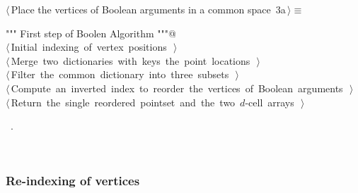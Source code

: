 \documentclass[11pt,oneside]{article}	%
\begin{document}
\begin{flushleft} \small
\begin{minipage}{\linewidth} \label{scrap3}
\protect{}$\langle\,$Place the vertices of Boolean arguments in a common space\nobreak\ {\footnotesize 3a}$\,\rangle\equiv$
\vspace{-1ex}
\begin{list}{}{} \item
\mbox{}\verb@""" First step of Boolen Algorithm """@\\
\mbox{}\verb@@\hbox{$\langle\,$Initial indexing of vertex positions\nobreak\ {\footnotesize {}}$\,\rangle$}\verb@@\\
\mbox{}\verb@@\hbox{$\langle\,$Merge two dictionaries with keys the point locations\nobreak\ {\footnotesize {}}$\,\rangle$}\verb@@\\
\mbox{}\verb@@\hbox{$\langle\,$Filter the common dictionary into three subsets\nobreak\ {\footnotesize {}}$\,\rangle$}\verb@@\\
\mbox{}\verb@@\hbox{$\langle\,$Compute an inverted index to reorder the vertices of Boolean arguments\nobreak\ {\footnotesize {}}$\,\rangle$}\verb@@\\
\mbox{}\verb@@\hbox{$\langle\,$Return the single reordered pointset and the two $d$-cell arrays\nobreak\ {\footnotesize {}}$\,\rangle$}\verb@@\\
\mbox{}\verb@@{\NWsep}
\end{list}
\vspace{-1ex}
\footnotesize\addtolength{\baselineskip}{-1ex}
\begin{list}{}{\setlength{\itemsep}{-\parsep}\setlength{\itemindent}{-\leftmargin}}
\item \NWtxtMacroRefIn\ .
\end{list}
\end{minipage}\\[4ex]
\end{flushleft}

\subsubsection{Re-indexing of vertices}
\end{document}
